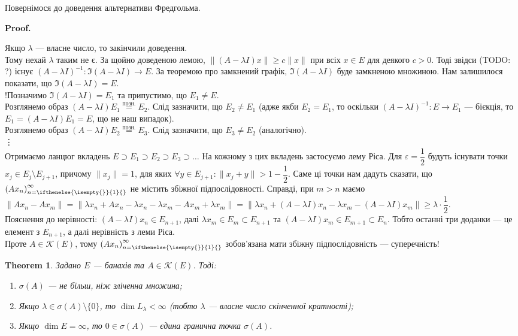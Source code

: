 \documentclass[a4paper, 10pt]{article}
\makeatletter
\theoremstyle{theoremdd}
\newtheorem{theorem}{Theorem}[subsection]
\theoremstyle{theoremdd}
\theoremstyle{theoremdd}
\theoremstyle{theoremdd}
\theoremstyle{theoremdd}
\theoremstyle{theoremdd}
\theoremstyle{theoremdd}
\theoremstyle{theoremdd}
\newcommand{\sequence}[2][]{\left({#2}\right)_{n=\ifthenelse{\isempty{#1}}{1}{#1}}^{\infty}}
\renewenvironment{proof}[1][Proof.\\]{\par
\pushQED{\hfill \qed}%
\normalfont \topsep6\p@\@plus6\p@\relax
\trivlist
\item\relax
{\bfseries
#1\@addpunct{.}}\hspace\labelsep\ignorespaces
}{%
\popQED\endtrivlist\@endpefalse
}
\makeatother
\begin{document}
Повернімося до доведення альтернативи Фредгольма.
\begin{proof}
Якщо $\lambda$ --- власне число, то закінчили доведення.\\
Тому нехай $\lambda$ таким не є. За щойно доведеною лемою, $\|(A-\lambda I)x\| \geq c \|x\|$ при всіх $x \in E$ для деякого $c > 0$. Тоді звідси (TODO: ?) існує $(A-\lambda I)^{-1} \colon \Im(A-\lambda I) \to E$. За теоремою про замкнений графік, $\Im(A-\lambda I)$ буде замкненою множиною. Нам залишилося показати, що $\Im(A-\lambda I) = E$.\\
!Позначимо $\Im(A-\lambda I) = E_1$ та припустимо, що $E_1 \neq E$.\\
Розглянемо образ $(A-\lambda I)E_1 \overset{\text{позн.}}{=} E_2$. Слід зазначити, що $E_2 \neq E_1$ (адже якби $E_2 = E_1$, то оскільки $(A-\lambda I)^{-1} \colon E \to E_1$ --- бієкція, то $E_1 = (A - \lambda I)E_1 = E$, що не наш випадок).\\
Розглянемо образ $(A-\lambda I)E_2 \overset{\text{позн.}}{=} E_3$. Слід зазначити, що $E_3 \neq E_2$ (аналогічно).\\
\vdots \\
Отримаємо ланцюг вкладень $E \supset E_1 \supset E_2 \supset E_3 \supset \dots$ На кожному з цих вкладень застосуємо лему Ріса. Для $\varepsilon = \dfrac{1}{2}$ будуть існувати точки $x_j \in E_j \setminus E_{j+1}$, причому $\|x_j\| = 1$, для яких $\forall y \in E_{j+1}: \|x_j + y\| > 1 - \dfrac{1}{2}$. Саме ці точки нам дадуть сказати, що $\sequence{A x_n}$ не містить збіжної підпослідовності. Справді, при $m > n$ маємо\\
$\| Ax_n - Ax_m \| = \| \lambda x_n + Ax_n - \lambda x_n - \lambda x_m - Ax_m + \lambda x_m \| = \| \lambda x_n + (A-\lambda I)x_n - \lambda x_m - (A-\lambda I)x_m\| \geq \lambda \cdot \dfrac{1}{2}$.\\
Пояснення до нерівності: $(A-\lambda I)x_n \in E_{n+1}$, далі $\lambda x_m \in E_m \subset E_{n+1}$ та $(A-\lambda I) x_m \in E_{m+1} \subset E_n$. Тобто останні три доданки --- це елемент з $E_{n+1}$, а далі нерівність з леми Ріса.\\
Проте $A \in \mathcal{K}(E)$, тому $\sequence{A x_n}$ зобов'язана мати збіжну підпослідовність --- суперечність!
\end{proof}

\begin{theorem}
Задано $E$ --- банахів та $A \in \mathcal{K}(E)$. Тоді:
\begin{enumerate}[nosep,wide=0pt,label={\arabic*)}]
\item $\sigma(A)$ --- не більш, ніж зліченна множина;
\item Якщо $\lambda \in \sigma(A) \setminus \{0\}$, то $\dim L_\lambda < \infty$ (тобто $\lambda$ --- власне число скінченної кратності);
\item Якщо $\dim E = \infty$, то $0 \in \sigma(A)$ --- єдина гранична точка $\sigma(A)$.
\end{enumerate} 
\end{theorem}
\end{document}
